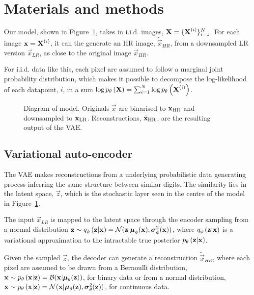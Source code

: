 \section{Materials and methods}
\label{sec:method}

Our model, shown in Figure~\ref{fig:diagram}, takes in i.i.d. images, $\bm{\mathrm{X}} = \{\bm{\mathrm{X}}^{(i)}\}^N_{i=1}$. For each image $\bm{\mathrm{x}} = \bm{\mathrm{X}}^{(i)}$, it can the generate an HR image, $\tilde{\vec{x}}_{HR}$, from a downsampled LR version $\vec{x}_{LR}$, as close to the original image $\vec{x}_{HR}$.

For i.i.d. data like this, each pixel are assumed to follow a marginal joint probability distribution, which makes it possible to decompose the log-likelihood of each datapoint, $i$, in a sum $\log p_{\theta}\left(\bm{\mathrm{X}}\right) = \sum^N_{i=1} \log p_{\theta}\left(\bm{\mathrm{X}}^{(i)}\right)$. 

\begin{figure*}
	\centering
	
	\caption{Diagram of model. Originals $\vec{x}$ are binarised to $\bm{\mathrm{x}}_{\text{HR}}$ and downsampled to $\bm{\mathrm{x}}_{\text{LR}}$. Reconstructions, $\tilde{\bm{\mathrm{x}}}_{\text{HR}}$, are the resulting output of the VAE.}
	\label{fig:diagram}
\end{figure*}

\subsection{Variational auto-encoder}
\label{sub:vae}

The VAE makes reconstructions from a underlying probabilistic data generating process inferring the same structure between similar digits. The similarity lies in the latent space, $\vec{z}$, which is the stochastic layer seen in the centre of the model in Figure~\ref{fig:diagram}. 

The input $\vec{x}_{LR}$ is mapped to the latent space through the encoder sampling from a normal distribution
$\bm{\mathrm{z}} \sim q_{\phi}\left(\bm{\mathrm{z}}|\bm{\mathrm{x}}\right) = \mathcal{N}( \bm{\mathrm{z}}|\bm{\mathrm{\mu}}_\phi(\bm{\mathrm{x}}),\bm{\mathrm{\sigma}}^2_\phi(\bm{\mathrm{x}}))$, where $q_{\phi}\left(\bm{\mathrm{z}}|\bm{\mathrm{x}}\right)$ is a variational approximation to the intractable true posterior $p_{\theta}\left(\bm{\mathrm{z}}|\bm{\mathrm{x}}\right)$.

Given the sampled $\vec{z}$, the decoder can generate a reconstruction $\tilde{\vec{x}}_{HR}$, where each pixel are assumed to be drawn from a Bernoulli distribution, $\bm{\mathrm{x}} \sim p_{\theta}\left(\bm{\mathrm{x}}|\bm{\mathrm{z}}\right)=\mathcal{B}( \bm{\mathrm{x}}|\bm{\mathrm{\mu}}_\theta(\bm{\mathrm{z}}))$, for binary data or from a normal distribution, $\bm{\mathrm{x}} \sim p_{\theta}\left(\bm{\mathrm{x}}|\bm{\mathrm{z}}\right)=\mathcal{N}( \bm{\mathrm{x}}|\bm{\mathrm{\mu}}_\theta(\bm{\mathrm{z}}),\bm{\mathrm{\sigma}}^2_\theta(\bm{\mathrm{z}}))$, for continuous data.

